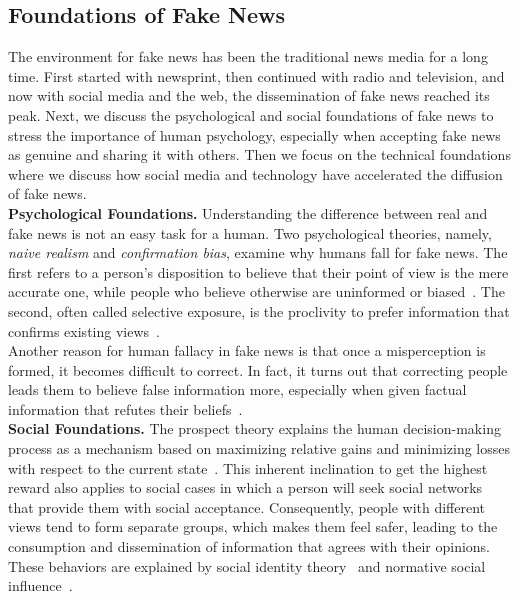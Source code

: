 \subsection{Foundations of Fake News}
\label{subsec:fakeNewsDetection_FoundationsOfFakeNews}
The environment for fake news has been the traditional news media for a long time. First started with newsprint,
then continued with radio and television, and now with social media and the web, the dissemination of fake news reached its peak. Next, we discuss the psychological and social foundations of fake news to stress the importance
of human psychology, especially when accepting fake news as genuine and sharing it with others. Then we focus on
the technical foundations where we discuss how social media and technology have accelerated the diffusion of fake news.\\
\textbf{Psychological Foundations.}  Understanding the difference between real and fake news is not an easy task
for a human. Two psychological theories, namely, \emph{naive realism} and \emph{confirmation bias}, examine why humans fall for fake news. The first refers to a person's disposition to believe that their point of view is the
mere accurate one, while people who believe otherwise are uninformed or biased~\parencite{NaiveRealism_Reed}.
The second, often called selective exposure, is the proclivity to prefer information that confirms existing views~\parencite{ConfirmationBias_Nickerson}.\\
Another reason for human fallacy in fake news is that once a misperception is formed, it becomes difficult to correct. In fact, it turns out that correcting people leads them to believe false information more, especially
when given factual information that refutes their beliefs~\parencite{WhenCorrectionsFail_Nyhan}.\\
\textbf{Social Foundations.}  The prospect theory explains the human decision-making process as a mechanism
based on maximizing relative gains and minimizing losses with respect to the current
state~\parencite{ProspectTheory_Kahneman, AdvancesInProspectTheory_Kahneman}. This inherent inclination to get the highest reward also applies to social cases in which a person will seek social networks that provide them with
social acceptance. Consequently,  people with different views tend to form separate groups, which makes them feel safer, leading to the consumption and dissemination of information that agrees with their opinions. These behaviors are explained by social identity theory~\parencite{SocialIdentityTheory_Ashforth} and normative social influence~\parencite{NormativeSocialInfluence_Asch}.\\
